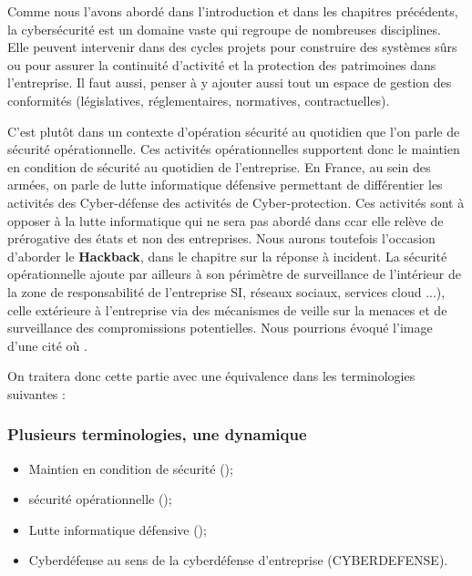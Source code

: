 Comme nous l’avons abordé dans l'introduction et dans les chapitres précédents, la cybersécurité est un domaine vaste qui regroupe de nombreuses disciplines. Elle peuvent intervenir dans des cycles projets pour construire des systèmes sûrs ou pour assurer la continuité d’activité et la protection des patrimoines dans l'entreprise. Il faut aussi, penser à y ajouter aussi tout un espace de gestion des conformités (législatives, réglementaires, normatives, contractuelles).


C’est plutôt dans un contexte d'opération sécurité au quotidien que l’on parle de sécurité opérationnelle. Ces activités opérationnelles supportent donc le maintien en condition de sécurité au quotidien de l’entreprise. En France, au sein des armées, on parle de lutte informatique défensive permettant de différentier les activités des Cyber-défense des activités de Cyber-protection. Ces activités sont à opposer à la lutte informatique qui ne sera pas abordé dans c\ecours car elle relève de prérogative des états et non des entreprises. Nous aurons toutefois l'occasion d'aborder le \textbf{Hackback}, dans le chapitre sur la réponse à incident.
La sécurité opérationnelle ajoute par ailleurs à son périmètre de surveillance de l'intérieur de la zone de responsabilité de l'entreprise SI, réseaux sociaux, services cloud ...), celle extérieure à l'entreprise via des mécanismes de veille sur la menaces et de surveillance des compromissions potentielles. Nous pourrions évoqué l'image d'une cité où .

On traitera donc cette partie avec une équivalence dans les terminologies suivantes :

\begin{frame}
\frametitle<presentation>{Plusieurs terminologies, une dynamique}
	\begin{itemize}
		\item Maintien en condition de sécurité (); 
		\item sécurité opérationnelle ();
		\item Lutte informatique défensive ();
		\item Cyberdéfense au sens de la cyberdéfense d'entreprise (CYBERDEFENSE).
	\end{itemize}
\end{frame}

